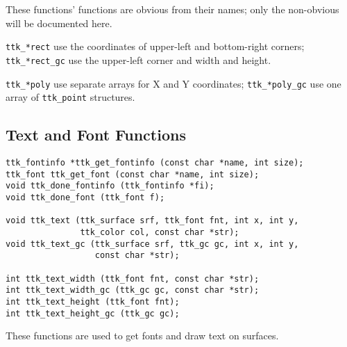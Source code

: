 \documentclass[12pt,letterpaper]{report}
\begin{document}
These functions' functions are obvious from their names; only the non-obvious will be documented here.

\verb|ttk_*rect| use the coordinates of upper-left and bottom-right corners; \verb|ttk_*rect_gc| use
the upper-left corner and width and height.

\verb|ttk_*poly| use separate arrays for X and Y coordinates; \verb|ttk_*poly_gc| use one array of
\verb|ttk_point| structures.

\subsection{Text and Font Functions}
\begin{verbatim}
ttk_fontinfo *ttk_get_fontinfo (const char *name, int size);
ttk_font ttk_get_font (const char *name, int size);
void ttk_done_fontinfo (ttk_fontinfo *fi);
void ttk_done_font (ttk_font f);

void ttk_text (ttk_surface srf, ttk_font fnt, int x, int y,
               ttk_color col, const char *str);
void ttk_text_gc (ttk_surface srf, ttk_gc gc, int x, int y,
                  const char *str);

int ttk_text_width (ttk_font fnt, const char *str);
int ttk_text_width_gc (ttk_gc gc, const char *str);
int ttk_text_height (ttk_font fnt);
int ttk_text_height_gc (ttk_gc gc);
\end{verbatim}

These functions are used to get fonts and draw text on surfaces.
\end{document}
